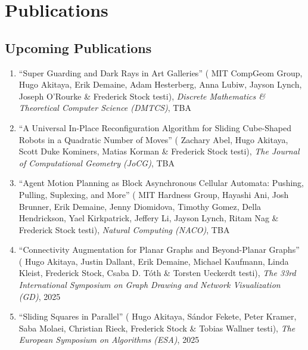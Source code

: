 \documentclass[letterpaper,11pt]{article}
\makeatletter
\newcommand{\resumeSubHeadingListStart}{\begin{itemize}[leftmargin=*]}
\newcommand{\resumeSubHeadingListEnd}{\end{itemize}}
\newcommand{\publication}[6]{
  \item ``#1'' %
   (\ignorespaces#2 testi), %
     \emph{#3}, %
      #4%


}
\newcommand{\pdficon}{\faFilePdf}
\makeatother
\begin{document}
\section{Publications}


    \subsection*{Upcoming Publications}%
  
    \begin{enumerate}
    \setcounter{enumi}{\value{pubnum}}
      
        \publication
          {Super Guarding and Dark Rays in Art Galleries}
          {
 MIT CompGeom Group, Hugo Akitaya, Erik Demaine, Adam Hesterberg, Anna Lubiw, Jayson Lynch, Joseph O'Rourke \& Frederick Stock}
          {Discrete Mathematics \& Theoretical Computer Science (DMTCS)}
          {TBA}
          {%
%
%
%
          }
          {1}
 \vspace{-.5em}  
      
        \publication
          {A Universal In-Place Reconfiguration Algorithm for Sliding Cube-Shaped Robots in a Quadratic Number of Moves}
          {
 Zachary Abel, Hugo Akitaya, Scott Duke Kominers, Matias Korman \& Frederick Stock}
          {The Journal of Computational Geometry (JoCG)}
          {TBA}
          {%
%
%
%
          }
          {2}
 \vspace{-.5em}  
      
        \publication
          {Agent Motion Planning as Block Asynchronous Cellular Automata: Pushing, Pulling, Suplexing, and More}
          {
 MIT Hardness Group, Hayashi Ani, Josh Brunner, Erik Demaine, Jenny Diomidova, Timothy Gomez, Della Hendrickson, Yael Kirkpatrick, Jeffery Li, Jayson Lynch, Ritam Nag \& Frederick Stock}
          {Natural Computing (NACO)}
          {TBA}
          {%
\href{fred-stock.github.io/docstore/Push-Pull-NACO.pdf}{\pdficon}%
%
%
          }
          {3}
 \vspace{-.5em}  
      
        \publication
          {Connectivity Augmentation for Planar Graphs and Beyond-Planar Graphs}
          {
 Hugo Akitaya, Justin Dallant, Erik Demaine, Michael Kaufmann, Linda Kleist, Frederick Stock, Csaba D. Tóth \& Torsten Ueckerdt}
          {The 33rd International Symposium on Graph Drawing and Network Visualization (GD)}
          {2025}
          {%
%
%
%
          }
          {4}
 \vspace{-.5em}  
      
        \publication
          {Sliding Squares in Parallel}
          {
 Hugo Akitaya, Sándor Fekete, Peter Kramer, Saba Molaei, Christian Rieck, Frederick Stock \& Tobias Wallner}
          {The European Symposium on Algorithms (ESA)}
          {2025}
          {%
%
%
%
          }
          {5}
 
    \setcounter{pubnum}{\value{enumi}}
    \end{enumerate}
\end{document}
